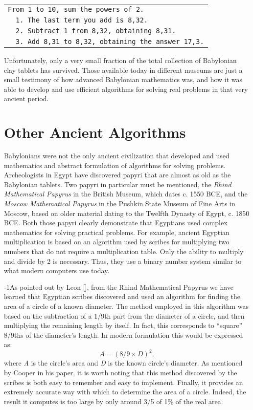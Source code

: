 \medskip
{
\noindent \begin{tabular}{lp{335.0pt}}
\hline
\multicolumn{2}{l}{\texttt{From 1 to 10, sum the powers of 2.}}\\
&\texttt{1. The last term you add is 8,32.}\\
&\texttt{2. Subtract 1 from 8,32, obtaining 8,31.}\\
&\texttt{3. Add 8,31 to 8,32, obtaining the answer 17,3.}\\\hline
\end{tabular}

\medskip
Unfortunately, only a very small fraction of the total collection of Babylonian clay tablets has survived. Those available today in different museums are just a small testimony of how advanced Babylonian mathematics was, and how it was able to develop and use efficient algorithms for solving real problems in that very ancient period.

\section{\label{sec:1.3}Other Ancient Algorithms}

Babylonians were not the only ancient civilization that developed and used mathematics and abstract formulation of algorithms for solving problems. Archeologists in Egypt have discovered papyri that are almost as old as the Babylonian tablets. Two papyri in particular must be mentioned, the \textit{Rhind Mathematical Papyrus} in the British Museum, which dates c. 1550 BCE, and the \textit{Moscow Mathematical Papyrus} in the Pushkin State Museum of Fine Arts in Moscow, based on older material dating to the Twelfth Dynasty of Egypt, c. 1850 BCE. Both those papyri clearly demonstrate that Egyptians used complex mathematics for solving practical problems. For example, ancient Egyptian multiplication is based on an algorithm used by scribes for multiplying two numbers that do not require a multiplication table. Only the ability to multiply and divide by 2 is necessary. Thus, they use a binary number system similar to what modern computers use today.

\looseness-1As pointed out by Leon \citeauthor{chap:01:Cooper:2011} [\citeyear{chap:01:Cooper:2011}], from the Rhind Mathematical Papyrus we have learned that Egyptian scribes discovered and used an algorithm for finding the area of a circle of a known diameter. The method employed in this algorithm was based on the subtraction of a 1/9th part from the diameter of a circle, and then multiplying the remaining length by itself. In fact, this corresponds to ``square'' 8/9ths of the diameter's length. In modern formulation this would be expressed as:
\begin{equation*}
A=(8/9\times D)^{2},
\end{equation*}
where \textit{A} is the circle's area and \textit{D} is the known circle's diameter. As mentioned by Cooper in his paper, it is worth noting that this method discovered by the scribes is both easy to remember and easy to implement. Finally, it provides an extremely accurate way with which to determine the area of a circle. Indeed, the result it computes is too large by only around 3/5 of 1\% of the real area.

}

